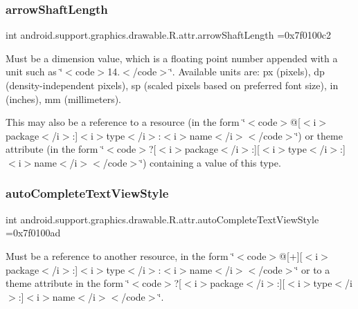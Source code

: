 \subsubsection{\texorpdfstring{arrow\+Shaft\+Length}{arrowShaftLength}}
{\footnotesize\ttfamily int android.\+support.\+graphics.\+drawable.\+R.\+attr.\+arrow\+Shaft\+Length =0x7f0100c2\hspace{0.3cm}{\ttfamily [static]}}

Must be a dimension value, which is a floating point number appended with a unit such as \char`\"{}$<$code$>$14.\+5sp$<$/code$>$\char`\"{}. Available units are\+: px (pixels), dp (density-\/independent pixels), sp (scaled pixels based on preferred font size), in (inches), mm (millimeters). 

This may also be a reference to a resource (in the form \char`\"{}$<$code$>$@\mbox{[}$<$i$>$package$<$/i$>$\+:\mbox{]}$<$i$>$type$<$/i$>$\+:$<$i$>$name$<$/i$>$$<$/code$>$\char`\"{}) or theme attribute (in the form \char`\"{}$<$code$>$?\mbox{[}$<$i$>$package$<$/i$>$\+:\mbox{]}\mbox{[}$<$i$>$type$<$/i$>$\+:\mbox{]}$<$i$>$name$<$/i$>$$<$/code$>$\char`\"{}) containing a value of this type. \mbox{\label{classandroid_1_1support_1_1graphics_1_1drawable_1_1R_1_1attr_a2862ca02793d05b99f24d999fdca867a}} 
\subsubsection{\texorpdfstring{auto\+Complete\+Text\+View\+Style}{autoCompleteTextViewStyle}}
{\footnotesize\ttfamily int android.\+support.\+graphics.\+drawable.\+R.\+attr.\+auto\+Complete\+Text\+View\+Style =0x7f0100ad\hspace{0.3cm}{\ttfamily [static]}}

Must be a reference to another resource, in the form \char`\"{}$<$code$>$@\mbox{[}+\mbox{]}\mbox{[}$<$i$>$package$<$/i$>$\+:\mbox{]}$<$i$>$type$<$/i$>$\+:$<$i$>$name$<$/i$>$$<$/code$>$\char`\"{} or to a theme attribute in the form \char`\"{}$<$code$>$?\mbox{[}$<$i$>$package$<$/i$>$\+:\mbox{]}\mbox{[}$<$i$>$type$<$/i$>$\+:\mbox{]}$<$i$>$name$<$/i$>$$<$/code$>$\char`\"{}. \mbox{\label{classandroid_1_1support_1_1graphics_1_1drawable_1_1R_1_1attr_a3bcf8ed63067952879bd81cf46281381}} 
